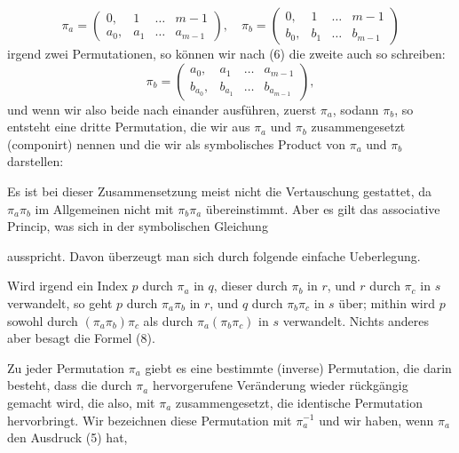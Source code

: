 
\[
\pi_a = \begin{pmatrix} 0, & 1 & \ldots & m-1 \\ a_0, & a_1 & \ldots & a_{m-1} \end{pmatrix}, \quad
\pi_b = \begin{pmatrix} 0, & 1 & \ldots & m-1 \\ b_0, & b_1 & \ldots & b_{m-1} \end{pmatrix}
\]
irgend zwei Permutationen, so können wir nach (6) die zweite auch so
schreiben:
\[
\pi_b = \begin{pmatrix} a_0, & a_1 & \ldots & a_{m-1} \\ b_{a_0}, & b_{a_1} & \ldots & b_{a_{m-1}} \end{pmatrix},
\]
und wenn wir also beide nach einander ausführen, zuerst $\pi_a$,
sodann $\pi_b$, so entsteht eine dritte Permutation, die wir aus
$\pi_a$ und $\pi_b$ zusammengesetzt (componirt) nennen und die wir als
symbolisches Product von $\pi_a$ und $\pi_b$ darstellen:


Es ist bei dieser Zusammensetzung meist nicht die Vertauschung
gestattet, da $\pi_a \pi_b$ im Allgemeinen nicht mit $\pi_b \pi_a$
übereinstimmt. Aber es gilt das associative Princip, was sich in der
symbolischen Gleichung


ausspricht. Davon überzeugt man sich durch folgende einfache
Ueberlegung.

Wird irgend ein Index $p$ durch $\pi_a$ in $q$, dieser durch $\pi_b$
in $r$, und $r$ durch $\pi_c$ in $s$ verwandelt, so geht $p$ durch
$\pi_a \pi_b$ in $r$, und $q$ durch $\pi_b \pi_c$ in $s$ über; mithin
wird $p$ sowohl durch $(\pi_a \pi_b)\pi_c$ als durch
$\pi_a(\pi_b \pi_c)$ in $s$ verwandelt. Nichts anderes aber besagt die
Formel (8).

Zu jeder Permutation $\pi_a$ giebt es eine bestimmte
 (inverse) Permutation, die darin besteht,
dass die durch $\pi_a$ hervorgerufene Veränderung wieder rückgängig
gemacht wird, die also, mit $\pi_a$ zusammengesetzt, die identische
Permutation hervorbringt. Wir bezeichnen diese Permutation mit
$\pi_a^{-1}$ und wir haben, wenn $\pi_a$ den Ausdruck (5) hat,

